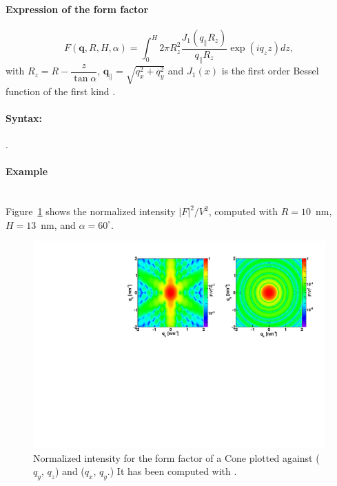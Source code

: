 \paragraph{Expression of the form factor}
\begin{equation*}
F(\mathbf{q}, R, H, \alpha) = \int_0 ^H 2\pi R_z^2
\frac{J_1(q_{\parallel}R_z)}{q_{\parallel} R_z}\exp(iq_z z)dz,
\end{equation*}
with $R_z =R-\dfrac{z}{\tan \alpha}$, $\mathbf{q}_{\parallel}=\sqrt{q_x^2+ q_y^2}$ and $J_1(x)$ is the first order
Bessel function of the first kind \cite{AbSt64}.

\paragraph{Syntax:}  . 

\paragraph{Example}\mbox{}\\
Figure~\ref{fig:FFConeEx} shows the normalized intensity
$|F|^2/V^2$, computed with $R=10$~nm, $H=13$~nm, and $\alpha=60^{\circ}$.
\begin{figure}[h]
\begin{center}
\includegraphics[width=\textwidth]{Figures/figffcone}
\end{center}
\caption{Normalized intensity for the form factor of a Cone plotted against ($q_y$, $q_z$) and ($q_x$, $q_y$.) It
  has been  computed with .}
\label{fig:FFConeEx}
\end{figure}

